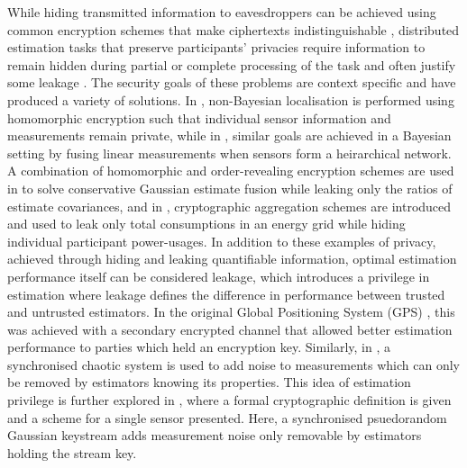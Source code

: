 \documentclass[conference]{IEEEtran}
\begin{document}
While hiding transmitted information to eavesdroppers can be achieved using common encryption schemes that make ciphertexts indistinguishable \cite{katzIntroductionModernCryptography2008}, distributed estimation tasks that preserve participants' privacies require information to remain hidden during partial or complete processing of the task and often justify some leakage \cite{risticSecureFastCovariance2021,shiPrivacyPreservingAggregationTimeSeries2011}. The security goals of these problems are context specific and have produced a variety of solutions. In \cite{alanwarPrOLocResilientLocalization2017}, non-Bayesian localisation is performed using homomorphic encryption such that individual sensor information and measurements remain private, while in \cite{aristovEncryptedMultisensorInformation2018}, similar goals are achieved in a Bayesian setting by fusing linear measurements when sensors form a heirarchical network. A combination of homomorphic and order-revealing encryption schemes are used in \cite{risticSecureFastCovariance2021} to solve conservative Gaussian estimate fusion while leaking only the ratios of estimate covariances, and in \cite{shiPrivacyPreservingAggregationTimeSeries2011,joyeScalableSchemePrivacyPreserving2013}, cryptographic aggregation schemes are introduced and used to leak only total consumptions in an energy grid while hiding individual participant power-usages. In addition to these examples of privacy, achieved through hiding and leaking quantifiable information, optimal estimation performance itself can be considered leakage, which introduces a privilege in estimation where leakage defines the difference in performance between trusted and untrusted estimators. In the original Global Positioning System (GPS) \cite{grovesPrinciplesGNSSInertial2015}, this was achieved with a secondary encrypted channel that allowed better estimation performance to parties which held an encryption key. Similarly, in \cite{murguiaInformationTheoreticPrivacyChaos2020}, a synchronised chaotic system is used to add noise to measurements which can only be removed by estimators knowing its properties. This idea of estimation privilege is further explored in \cite{risticCryptographicallyPrivilegedState2022}, where a formal cryptographic definition is given and a scheme for a single sensor presented. Here, a synchronised psuedorandom Gaussian keystream adds measurement noise only removable by estimators holding the stream key.
\end{document}
